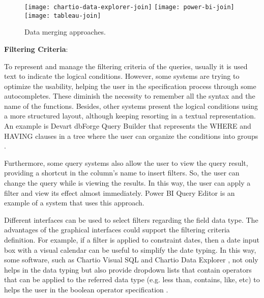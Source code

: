 \begin{figure}[htbp]
    \centering
      {\texttt{[image: chartio-data-explorer-join]}}%
    {\texttt{[image: power-bi-join]}}%
    \\
      {\texttt{[image: tableau-join]}}%
  \caption{Data merging approaches.}
    \label{fig:approaches_select_data_sources}
\end{figure}

\textbf{Filtering Criteria}: 

To represent and manage the filtering criteria of the queries, usually it is used text to indicate the logical conditions. However, some systems are trying to optimize the usability, helping the user in the specification process through some autocompletes. These diminish the necessity to remember all the syntax and the name of the functions. 
Besides, other systems present the logical conditions using a more structured layout, although keeping resorting in a textual representation. An example is Devart dbForge Query Builder \cite{dbForgeQueryBuilder} that represents the WHERE and HAVING clauses in a tree where the user can organize the conditions into groups \cite{dbForgeBuildingWhereOrHavingClause}.

Furthermore, some query systems also allow the user to view the query result, providing a shortcut in the column's name to insert filters. So, the user can change the query while is viewing the results. In this way, the user can apply a filter and view its effect almost immediately. Power BI Query Editor \cite{powerBI} is an example of a system that uses this approach.

Different interfaces can be used to select filters regarding the field data type. The advantages of the graphical interfaces could support the filtering criteria definition. For example, if a filter is applied to constraint dates, then a date input box with a visual calendar can be useful to simplify the date typing. In this way, some software, such as Chartio Visual SQL \cite{chartioVisualSQL} and Chartio Data Explorer \cite{chartioDataExplorer}, not only helps in the data typing but also provide dropdown lists that contain operators that can be applied to the referred data type (e.g. less than, contains, like, etc)  to helps the user in the boolean operator specification \cite{chartioDataExplorer,visualSqlActions}.

